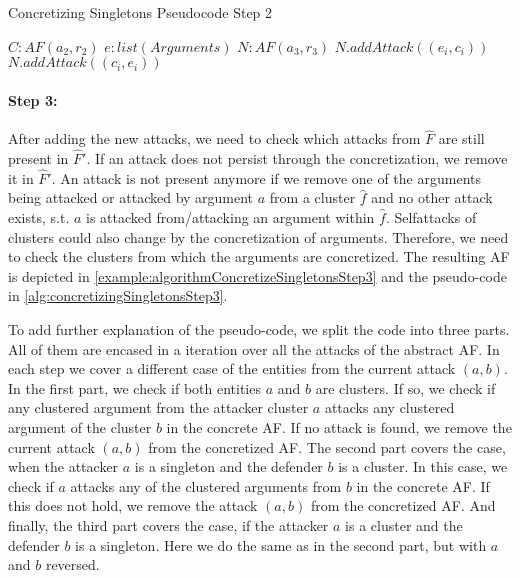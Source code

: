 \begin{algorithm}[H]
    \caption{Concretizing Singletons Pseudocode Step 2}\label{alg:concretizingSingletonsStep2}
    \begin{algorithmic}[1]
        \Require $C: AF(a_2, r_2)$ 
        \Require $e: list(Arguments)$ 
        \Require $N: AF(a_3, r_3)$ 
             
                    \State $N.addAttack((e_i, c_i))$
                \EndIf
            \EndFor
             
                    \State $N.addAttack((c_i, e_i))$
                \EndIf
            \EndFor
        \EndFor
    \end{algorithmic}
\end{algorithm}



\paragraph{Step 3:} After adding the new attacks, we need to check which attacks from $\hat{F}$ are still present in $\hat{F}'$. If an attack does not persist through the concretization, we remove it in $\hat{F}'$. An attack is not present anymore if we remove one of the arguments being attacked or attacked by argument $a$ from a cluster $\hat{f}$ and no other attack exists, s.t. $a$ is attacked from/attacking an argument within $\hat{f}$. Selfattacks of clusters could also change by the concretization of arguments. Therefore, we need to check the clusters from which the arguments are concretized. The resulting AF is depicted in \cref{example:algorithmConcretizeSingletonsStep3} and the pseudo-code in \cref{alg:concretizingSingletonsStep3}.

To add further explanation of the pseudo-code, we split the code into three parts. All of them are encased in a iteration over all the attacks of the abstract AF. In each step we cover a different case of the entities from the current attack $(a, b)$.
In the first part, we check if both entities $a$ and $b$ are clusters. If so, we check if any clustered argument from the attacker cluster $a$ attacks any clustered argument of the cluster $b$ in the concrete AF. If no attack is found, we remove the current attack $(a, b)$ from the concretized AF.
The second part covers the case, when the attacker $a$ is a singleton and the defender $b$ is a cluster. In this case, we check if $a$ attacks any of the clustered arguments from $b$ in the concrete AF. If this does not hold, we remove the attack $(a, b)$ from the concretized AF.
And finally, the third part covers the case, if the attacker $a$ is a cluster and the defender $b$ is a singleton. Here we do the same as in the second part, but with $a$ and $b$ reversed.

